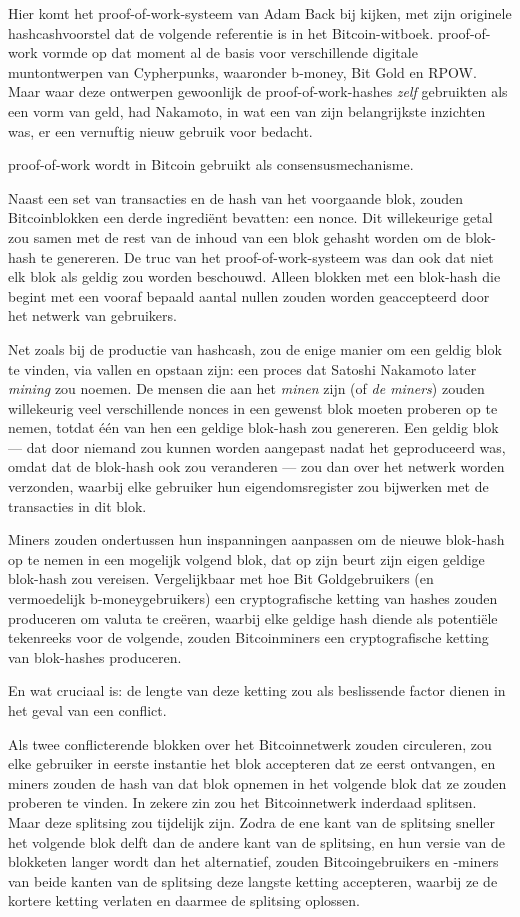 \documentclass[
  a5paper,
  smalldemyvopaper,11pt,twoside,onecolumn,openright,extrafontsizes,
hidelinks]{memoir}
\begin{document}
Hier komt het proof-of-work-systeem van Adam Back bij kijken, met zijn
originele hashcashvoorstel dat de volgende referentie is in het
Bitcoin-witboek. proof-of-work vormde op dat moment al de basis voor
verschillende digitale muntontwerpen van Cypherpunks, waaronder b-money,
Bit Gold en RPOW. Maar waar deze ontwerpen gewoonlijk de
proof-of-work-hashes \emph{zelf} gebruikten als een vorm van geld, had
Nakamoto, in wat een van zijn belangrijkste inzichten was, er een
vernuftig nieuw gebruik voor bedacht.

proof-of-work wordt in Bitcoin gebruikt als consensusmechanisme.

Naast een set van transacties en de hash van het voorgaande blok, zouden
Bitcoinblokken een derde ingrediënt bevatten: een nonce. Dit
willekeurige getal zou samen met de rest van de inhoud van een blok
gehasht worden om de blok-hash te genereren. De truc van het
proof-of-work-systeem was dan ook dat niet elk blok als geldig zou
worden beschouwd. Alleen blokken met een blok-hash die begint met een
vooraf bepaald aantal nullen zouden worden geaccepteerd door het netwerk
van gebruikers.

Net zoals bij de productie van hashcash, zou de enige manier om een
geldig blok te vinden, via vallen en opstaan zijn: een proces dat
Satoshi Nakamoto later \emph{mining} zou noemen. De mensen die aan het
\emph{minen} zijn (of \emph{de miners}) zouden willekeurig veel
verschillende nonces in een gewenst blok moeten proberen op te nemen,
totdat één van hen een geldige blok-hash zou genereren. Een geldig blok
--- dat door niemand zou kunnen worden aangepast nadat het geproduceerd
was, omdat dat de blok-hash ook zou veranderen --- zou dan over het
netwerk worden verzonden, waarbij elke gebruiker hun eigendomsregister
zou bijwerken met de transacties in dit blok.

Miners zouden ondertussen hun inspanningen aanpassen om de nieuwe
blok-hash op te nemen in een mogelijk volgend blok, dat op zijn beurt
zijn eigen geldige blok-hash zou vereisen. Vergelijkbaar met hoe Bit
Goldgebruikers (en vermoedelijk b-moneygebruikers) een cryptografische
ketting van hashes zouden produceren om valuta te creëren, waarbij elke
geldige hash diende als potentiële tekenreeks voor de volgende, zouden
Bitcoinminers een cryptografische ketting van blok-hashes produceren.

En wat cruciaal is: de lengte van deze ketting zou als beslissende
factor dienen in het geval van een conflict.

Als twee conflicterende blokken over het Bitcoinnetwerk zouden
circuleren, zou elke gebruiker in eerste instantie het blok accepteren
dat ze eerst ontvangen, en miners zouden de hash van dat blok opnemen in
het volgende blok dat ze zouden proberen te vinden. In zekere zin zou
het Bitcoinnetwerk inderdaad splitsen. Maar deze splitsing zou tijdelijk
zijn. Zodra de ene kant van de splitsing sneller het volgende blok delft
dan de andere kant van de splitsing, en hun versie van de blokketen
langer wordt dan het alternatief, zouden Bitcoingebruikers en -miners
van beide kanten van de splitsing deze langste ketting accepteren,
waarbij ze de kortere ketting verlaten en daarmee de splitsing oplossen.
\end{document}
